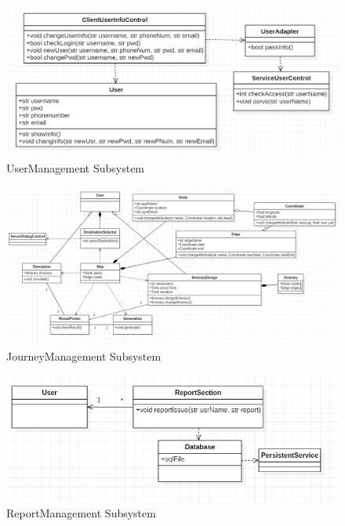 \documentclass[10pt]{article}
\begin{document}
\begin{figure}[H]
    \centering
    
    \includegraphics[width=14cm]{usermanagement.png}
    \caption{UserManagement Subsystem}
    \label{UserManagement Subsystem}
\end{figure}

\begin{figure}[H]
    \centering
    
    \includegraphics[width=14cm]{journeymanagement.png}
    \caption{JourneyManagement Subsystem}
    \label{JourneyManagement Subsystem}
\end{figure}

\begin{figure}[H]
    \centering
    
    \includegraphics[width=14cm]{reportmanagement.png}
    \caption{ReportManagement Subsystem}
    \label{ReportManagement Subsystem}
\end{figure}
\end{document}
